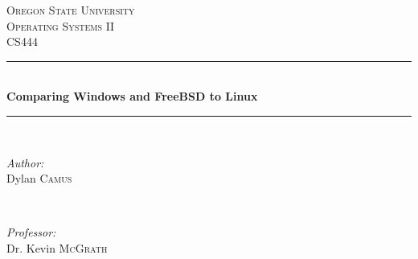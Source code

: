 \documentclass[journal,letterpaper,draftclsnofoot,onecolumn,10pt]{IEEEtran}
\begin{document}
\begin{titlepage}

\newcommand{\HRule}{\rule{\linewidth}{0.5mm}} %

\center %
 

\textsc{\LARGE Oregon State University}\\[1.5cm] %
\textsc{\Large Operating Systems II}\\[0.5cm] %
\textsc{\large CS444}\\[0.5cm] %


\HRule \\[0.4cm]
{ \huge \bfseries Comparing Windows and FreeBSD to Linux}\\[0.4cm] %
\HRule \\[1.5cm]
 

\begin{minipage}{0.4\textwidth}
   \begin{flushleft} \large
      \emph{Author:}\\
      Dylan \textsc{Camus} %
   \end{flushleft}
\end{minipage}
~
\begin{minipage}{0.4\textwidth}
   \begin{flushright} \large
      \emph{Professor:} \\
      Dr. Kevin \textsc{McGrath} %
   \end{flushright}
\end{minipage}\\[4cm]



\end{titlepage}
\end{document}

